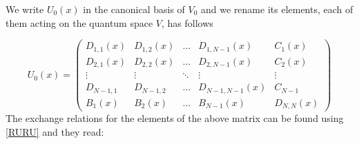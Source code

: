 \documentclass[10pt]{article}
\numberwithin{equation}{section}
\numberwithin{equation}{subsection}
\begin{document}
We write $U_{0}(x)$ in the canonical basis of $V_{0}$ and we rename its elements, each of them acting on the quantum space $V$, has follows

\begin{equation}
	U_{0}(x)=\begin{pmatrix}
		D_{1,1}(x)&D_{1,2}(x)&\ldots&D_{1,N-1}(x)&C_{1}(x)\\
		D_{2,1}(x)&D_{2,2}(x)&\ldots&D_{2,N-1}(x)&C_{2}(x)\\
		\vdots&\vdots&\ddots&\vdots&\vdots\\
		D_{N-1,1}&D_{N-1,2}&\ldots&D_{N-1,N-1}(x)&C_{N-1}\\
		B_{1}(x)&B_{2}(x)&\ldots&B_{N-1}(x)&D_{N,N}(x)
	\end{pmatrix}
\end{equation}
The exchange relations for the elements of the above matrix can be found using \eqref{RURU} and they read:
\end{document}
